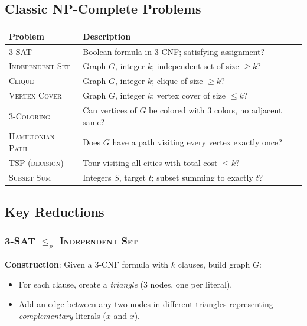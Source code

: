 \documentclass[oneside]{book}
\begin{document}

\subsection*{Classic NP-Complete Problems}

\begin{center}
\begin{tabularx}{\linewidth}{lX}
\toprule
\textbf{Problem} & \textbf{Description} \\
\midrule
\textsc{3-SAT}          & Boolean formula in 3-CNF; satisfying assignment? \\
\textsc{Independent Set} & Graph $G$, integer $k$; independent set of size $\geq k$? \\
\textsc{Clique}          & Graph $G$, integer $k$; clique of size $\geq k$? \\
\textsc{Vertex Cover}    & Graph $G$, integer $k$; vertex cover of size $\leq k$? \\
\textsc{3-Coloring}      & Can vertices of $G$ be colored with 3 colors, no adjacent same? \\
\textsc{Hamiltonian Path} & Does $G$ have a path visiting every vertex exactly once? \\
\textsc{TSP (decision)}  & Tour visiting all cities with total cost $\leq k$? \\
\textsc{Subset Sum}      & Integers $S$, target $t$; subset summing to exactly $t$? \\
\bottomrule
\end{tabularx}
\end{center}

\subsection*{Key Reductions}

\subsubsection*{\textsc{3-SAT} $\leq_p$ \textsc{Independent Set}}

\textbf{Construction}: Given a 3-CNF formula with $k$ clauses, build graph $G$:
\begin{itemize}
    \item For each clause, create a \emph{triangle} (3 nodes, one per literal).
    \item Add an edge between any two nodes in different triangles representing
          \emph{complementary} literals ($x$ and $\bar{x}$).
\end{itemize}
\end{document}
